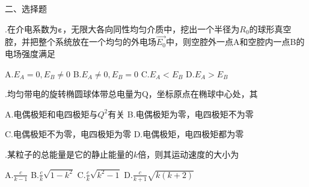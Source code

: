 \vspace{-0.8cm}
\noindent
二、\hspace{0.2em}选择题
\vspace{0.2cm}

.\hspace{0.8em}在介电系数为$\boldsymbol{\varepsilon}$，无限大各向同性均匀介质中，挖出一个半径为$R_0$的球形真空腔，并把整个系统放在一个均匀的外电场$\Vec{E_0}$中，则空腔外一点A和空腔内一点B的电场强度满足
\vspace{0.2cm}

A.\hspace{0.8em}$E_A = 0, E_B \neq 0$  \hspace{1em} B.\hspace{0.8em}$E_A \neq 0, E_B = 0$ \hspace{1em} C.\hspace{0.8em}$E_A < E_B $ \hspace{1em} D.\hspace{0.8em}$E_A > E_B $ 
\vspace{0.2cm}

.\hspace{0.8em}均匀带电的旋转椭圆球体带总电量为Q，坐标原点在椭球中心处，其
\vspace{0.2cm}

A.\hspace{0.8em}电偶极矩和电四极矩与$Q^2$有关 \hspace{2em} B.\hspace{0.8em}电偶极矩为零，电四极矩不为零\vspace{0.1cm}

C.\hspace{0.8em}电偶极矩不为零，电四极矩为零 \hspace{2em} D.\hspace{0.8em}电偶极矩，电四极矩都为零

\vspace{0.2cm}

.\hspace{0.8em}某粒子的总能量是它的静止能量的$k$倍，则其运动速度的大小为
\vspace{0.3cm}

A.\hspace{0.8em}$\displaystyle{ \frac{c}{k-1} }$  \hspace{2em} B.\hspace{0.8em}$\displaystyle{ \frac{c}{k} \sqrt{1-k^2} }$   \hspace{2em} C.\hspace{0.8em}$\displaystyle{ \frac{c}{k} \sqrt{k^2-1} }$   \hspace{2em} D.\hspace{0.8em}$\displaystyle{ \frac{c}{k+1} \sqrt{k(k+2)} }$

